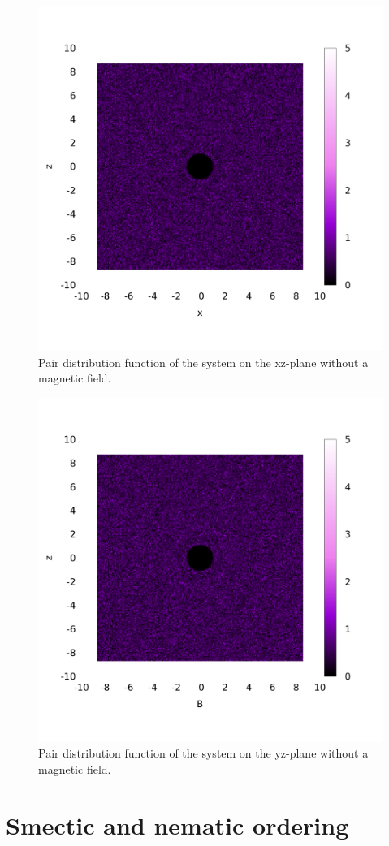 \documentclass[aip,graphicx]{revtex4-1} %
\begin{document}
\begin{figure}
    \centering
    \includegraphics[width=0.7\columnwidth]{gxz_noB.png}
    \caption{Pair distribution function of the system on the xz-plane without a magnetic field.}\label{fig:gxz_noB}
\end{figure}

\begin{figure}
    \centering
    \includegraphics[width=0.7\columnwidth]{gyz_noB.png}
    \caption{Pair distribution function of the system on the yz-plane without a magnetic field.}\label{fig:gyz_noB}
\end{figure}

\newpage

\section{Smectic and nematic ordering}
\end{document}
